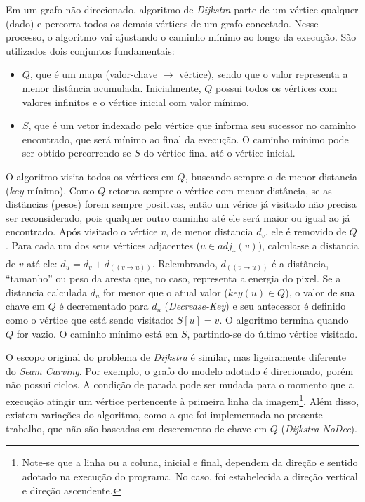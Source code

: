 Em um grafo não direcionado,
algoritmo de \emph{Dijkstra} parte de um vértice qualquer (dado) e 
percorra todos os demais vértices de um grafo conectado.
Nesse processo, o algoritmo vai ajustando o caminho mínimo ao longo da execução. 
São utilizados dois conjuntos fundamentais:

\begin{itemize}
\item $Q$, que é um mapa (valor-chave $\rightarrow$ vértice), 
    sendo que o valor representa a menor distância acumulada. 
    Inicialmente, $Q$ possui todos os vértices com valores infinitos 
    e o vértice inicial com valor mínimo.
\item $S$, que é um vetor indexado pelo vértice que informa 
    seu sucessor no caminho encontrado, que será mínimo ao final da execução.
    O caminho mínimo pode ser obtido percorrendo-se $S$ do vértice final
    até o vértice inicial.
\end{itemize}

O algoritmo visita todos os vértices em $Q$, 
buscando sempre o de menor distancia ($key$ mínimo).
Como $Q$ retorna sempre o vértice com menor distância,
se as distãncias (pesos) forem sempre positivas,
então um vérice já visitado não precisa ser reconsiderado,
pois qualquer outro caminho até ele será maior ou igual ao já encontrado.
Após visitado o vértice $v$, de menor distancia $d_v$, ele é removido de $Q$.
Para cada um dos seus vértices adjacentes ($u \in adj_{\uparrow}(v)$), 
calcula-se a distancia de $v$ até ele:
$d_u = d_v + d_{((v \rightarrow u))}$. 
Relembrando, $d_{((v \rightarrow u))}$ é 
a distãncia,  ``tamanho'' ou peso da aresta que,
no caso, representa a energia do pixel.
Se a distancia calculada $d_u$ for menor que o atual valor ($key(u) \in Q$),
o valor de sua chave em $Q$ é decrementado para $d_u$ ({\it Decrease-Key}) e 
seu antecessor é definido como o vértice que está sendo visitado: $S[u] = v$.
O algoritmo termina quando $Q$ for vazio. 
O caminho mínimo está em $S$, partindo-se do último vértice visitado.

O escopo original do problema de \emph{Dijkstra} é similar,
mas ligeiramente diferente do {\it Seam Carving}.
Por exemplo, o grafo do modelo adotado é direcionado, porém não possui ciclos.
A condição de parada pode ser mudada para 
o momento que a execução atingir um vértice pertencente 
à primeira linha da imagem\footnote{
Note-se que a linha ou a coluna, inicial e final, dependem da
direção e sentido adotado na execução do programa.
No caso, foi estabelecida a direção vertical e direção ascendente.
}.
Além disso, existem variações do algoritmo, 
como a que foi implementada no presente trabalho, 
que não são baseadas em descremento de chave em $Q$ 
({\it Dijkstra-NoDec})\cite{chen07priorityqueues}.

